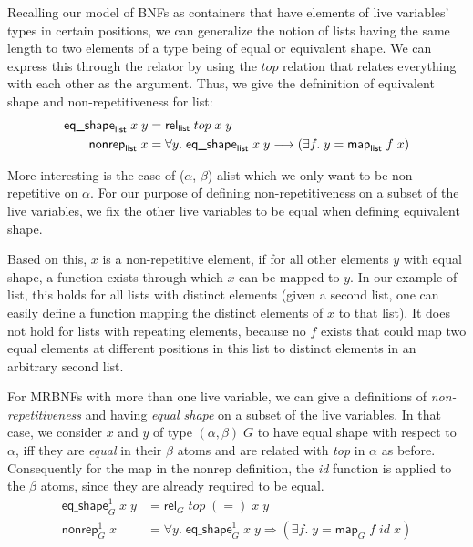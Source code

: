     Recalling our model of \ac{BNF}s as containers that have elements of live variables' types in certain positions, we can generalize the notion of lists having the same length to two elements of a type being of equal or equivalent shape. We can express this through the relator by using the $top$ relation that relates everything with each other as the argument. Thus, we give the defninition of equivalent shape and non-repetitiveness for list:
    \begin{align}
      \textsf{eq\_shape}_\textsf{list}\; x\; y &= \textsf{rel}_\textsf{list}\; top\; x\; y\\
      \textsf{nonrep}_\textsf{list}\; x &= \forall y.\; \textsf{\textsf{eq\_shape}}_\textsf{list}\; x\; y \longrightarrow (\exists f.\; y = \textsf{map}_\textsf{list}\; f\; x)
    \end{align}
    
    More interesting is the case of \textsf{($\alpha$, $\beta$) alist} which we only want to be non-repetitive on $\alpha$. For our purpose of defining non-repetitiveness on a subset of the live variables, we fix the other live variables to be equal when defining equivalent shape. 

    Based on this, $x$ is a non-repetitive element, if for all other elements $y$ with equal shape, a function exists through which $x$ can be mapped to $y$. In our example of \textsf{list}, this holds for all lists with distinct elements (given a second list, one can easily define a function mapping the distinct elements of $x$ to that list). It does not hold for lists with repeating elements, because no $f$ exists that could map two equal elements at different positions in this list to distinct elements in an arbitrary second list.

    For \acp{MRBNF} with more than one live variable, we can give a definitions of \textit{non-repetitiveness} and having \textit{equal shape} on a subset of the live variables. In that case, we consider $x$ and $y$ of type $(\alpha, \beta)\; G$ to have equal shape with respect to $\alpha$, iff they are \textit{equal} in their $\beta$ atoms and are related with \textit{top} in $\alpha$ as before. Consequently for the map in the \textsf{nonrep} definition, the \textit{id} function is applied to the $\beta$ atoms, since they are already required to be equal. 
    \begin{align}
      \textsf{eq\_shape}_G^1\; x\; y &= \textsf{rel}_G\; top\; (=)\; x\; y\\
      \textsf{nonrep}_G^1\; x &= \forall y.\; \textsf{eq\_shape}_G^1\; x\; y \Longrightarrow (\exists f.\; y = \textsf{map}_G\; f\; id\; x)
    \end{align}
    
